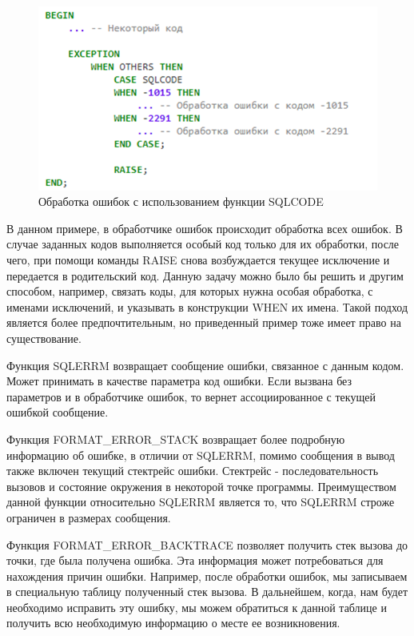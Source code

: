\begin{figure}[ht!] 
	\center
	\includegraphics [scale=1] {my_folder/img/C1_handling_by_sqlcode}
	\caption{Обработка ошибок с использованием функции SQLCODE} 
	\label{fig:C1_handling_by_sqlcode}  
\end{figure}
\FloatBarrier

В данном примере, в обработчике ошибок происходит обработка всех ошибок. В случае заданных кодов выполняется особый код только для их обработки, после чего, при помощи команды RAISE снова возбуждается текущее исключение и передается в родительский код. 
Данную задачу можно было бы решить и другим способом, например, связать коды, для которых нужна особая обработка, с именами исключений, и указывать в конструкции WHEN их имена. Такой подход является более предпочтительным, но приведенный пример тоже имеет право на существование.

Функция SQLERRM возвращает сообщение ошибки, связанное с данным кодом. Может принимать в качестве параметра код ошибки. Если вызвана без параметров и в обработчике ошибок, то вернет ассоциированное с текущей ошибкой сообщение. 

Функция FORMAT\_ERROR\_STACK возвращает более подробную информацию об ошибке, в отличии от SQLERRM, помимо сообщения в вывод также включен текущий стектрейс ошибки. Стектрейс - последовательность вызовов и состояние окружения в некоторой точке программы. Преимуществом данной функции относительно SQLERRM является то, что SQLERRM строже ограничен в размерах сообщения. 

Функция FORMAT\_ERROR\_BACKTRACE позволяет получить стек вызова до точки, где была получена ошибка. Эта информация может потребоваться для нахождения причин ошибки. Например, после обработки ошибок, мы записываем в специальную таблицу полученный стек вызова. В дальнейшем, когда, нам будет необходимо исправить эту ошибку, мы можем обратиться к данной таблице и получить всю необходимую информацию о месте ее возникновения. 


